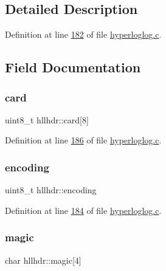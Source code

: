 \subsection{Detailed Description}


Definition at line \hyperlink{hyperloglog_8c_source_l00182}{182} of file \hyperlink{hyperloglog_8c_source}{hyperloglog.\+c}.



\subsection{Field Documentation}
\mbox{\label{structhllhdr_add0044c832d74626e0e34d5743b20022}} 
\subsubsection{\texorpdfstring{card}{card}}
{\footnotesize\ttfamily uint8\+\_\+t hllhdr\+::card\mbox{[}8\mbox{]}}



Definition at line \hyperlink{hyperloglog_8c_source_l00186}{186} of file \hyperlink{hyperloglog_8c_source}{hyperloglog.\+c}.

\mbox{\label{structhllhdr_ac5f5494006e3355919ef709c90d67887}} 
\subsubsection{\texorpdfstring{encoding}{encoding}}
{\footnotesize\ttfamily uint8\+\_\+t hllhdr\+::encoding}



Definition at line \hyperlink{hyperloglog_8c_source_l00184}{184} of file \hyperlink{hyperloglog_8c_source}{hyperloglog.\+c}.

\mbox{\label{structhllhdr_a0a101e2637165bfa83dcca6a6ac48b7f}} 
\subsubsection{\texorpdfstring{magic}{magic}}
{\footnotesize\ttfamily char hllhdr\+::magic\mbox{[}4\mbox{]}}



